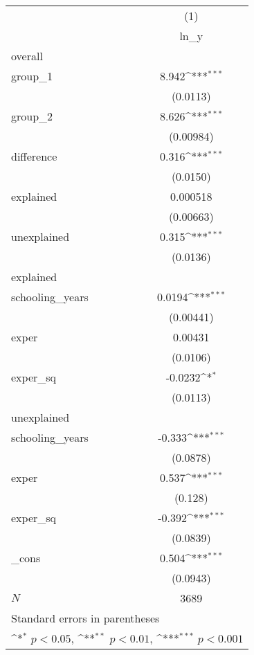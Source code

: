 {
\def\sym#1{\ifmmode^{#1}\else\(^{#1}\)\fi}
\begin{tabular}{l*{1}{c}}
\hline\hline
            &\multicolumn{1}{c}{(1)}\\
            &\multicolumn{1}{c}{ln\_y}\\
\hline
overall     &                     \\
group\_1     &       8.942\sym{***}\\
            &    (0.0113)         \\
[1em]
group\_2     &       8.626\sym{***}\\
            &   (0.00984)         \\
[1em]
difference  &       0.316\sym{***}\\
            &    (0.0150)         \\
[1em]
explained   &    0.000518         \\
            &   (0.00663)         \\
[1em]
unexplained &       0.315\sym{***}\\
            &    (0.0136)         \\
\hline
explained   &                     \\
schooling\_years&      0.0194\sym{***}\\
            &   (0.00441)         \\
[1em]
exper       &     0.00431         \\
            &    (0.0106)         \\
[1em]
exper\_sq    &     -0.0232\sym{*}  \\
            &    (0.0113)         \\
\hline
unexplained &                     \\
schooling\_years&      -0.333\sym{***}\\
            &    (0.0878)         \\
[1em]
exper       &       0.537\sym{***}\\
            &     (0.128)         \\
[1em]
exper\_sq    &      -0.392\sym{***}\\
            &    (0.0839)         \\
[1em]
\_cons      &       0.504\sym{***}\\
            &    (0.0943)         \\
\hline
\(N\)       &        3689         \\
\hline\hline
\multicolumn{2}{l}{\footnotesize Standard errors in parentheses}\\
\multicolumn{2}{l}{\footnotesize \sym{*} \(p<0.05\), \sym{**} \(p<0.01\), \sym{***} \(p<0.001\)}\\
\end{tabular}
}

